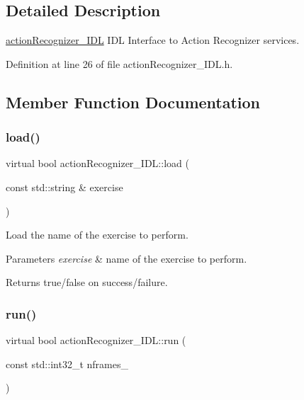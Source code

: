 \subsection{Detailed Description}
\hyperlink{classactionRecognizer__IDL}{action\+Recognizer\+\_\+\+I\+DL} I\+DL Interface to Action Recognizer services. 

Definition at line 26 of file action\+Recognizer\+\_\+\+I\+D\+L.\+h.



\subsection{Member Function Documentation}
\mbox{\label{classactionRecognizer__IDL_a59683b66e727607a3e12c0ab22d2d069}} 
\subsubsection{\texorpdfstring{load()}{load()}}
{\footnotesize\ttfamily virtual bool action\+Recognizer\+\_\+\+I\+D\+L\+::load (\begin{DoxyParamCaption}\item[{const std\+::string \&}]{exercise }\end{DoxyParamCaption})\hspace{0.3cm}{\ttfamily [virtual]}}



Load the name of the exercise to perform. 


\begin{DoxyParams}{Parameters}
{\em exercise} & name of the exercise to perform. \\
\hline
\end{DoxyParams}
\begin{DoxyReturn}{Returns}
true/false on success/failure. 
\end{DoxyReturn}
\mbox{\label{classactionRecognizer__IDL_a6e56afcbbc3a7c79deb5a7253b1d0b81}} 
\subsubsection{\texorpdfstring{run()}{run()}}
{\footnotesize\ttfamily virtual bool action\+Recognizer\+\_\+\+I\+D\+L\+::run (\begin{DoxyParamCaption}\item[{const std\+::int32\+\_\+t}]{nframes\+\_\+ }\end{DoxyParamCaption})\hspace{0.3cm}{\ttfamily [virtual]}}



